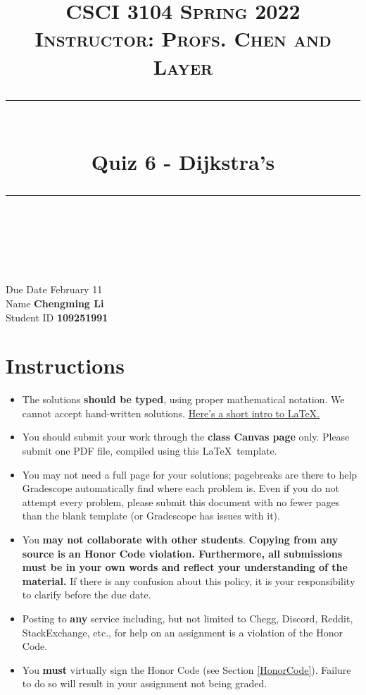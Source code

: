 \documentclass[11pt]{article}
\title{
\normalfont \normalsize 
\textsc{CSCI 3104 Spring 2022 \\ 
Instructor: Profs. Chen and Layer} \\
[10pt] 
\rule{\linewidth}{0.5pt} \\[6pt] 
\huge Quiz 6 - Dijkstra's \\
\rule{\linewidth}{2pt}  \\[10pt]
}
\date{}
\theoremstyle{definition}
\theoremstyle{definition}
\theoremstyle{definition}
\begin{document}
\maketitle


\noindent
Due Date \dotfill February 11 \\
Name \dotfill \textbf{Chengming Li} \\
Student ID \dotfill \textbf{109251991} \\


\tableofcontents

\section{Instructions}
 \begin{itemize}
	\item The solutions \textbf{should be typed}, using proper mathematical notation. We cannot accept hand-written solutions. \href{http://ece.uprm.edu/~caceros/latex/introduction.pdf}{Here's a short intro to \LaTeX.}
	\item You should submit your work through the \textbf{class Canvas page} only. Please submit one PDF file, compiled using this \LaTeX \ template.
	\item You may not need a full page for your solutions; pagebreaks are there to help Gradescope automatically find where each problem is. Even if you do not attempt every problem, please submit this document with no fewer pages than the blank template (or Gradescope has issues with it).

	\item You \textbf{may not collaborate with other students}. \textbf{Copying from any source is an Honor Code violation. Furthermore, all submissions must be in your own words and reflect your understanding of the material.} If there is any confusion about this policy, it is your responsibility to clarify before the due date. 

	\item Posting to \textbf{any} service including, but not limited to Chegg, Discord, Reddit, StackExchange, etc., for help on an assignment is a violation of the Honor Code.

	\item You \textbf{must} virtually sign the Honor Code (see Section \ref{HonorCode}). Failure to do so will result in your assignment not being graded.
\end{itemize}
\end{document}
